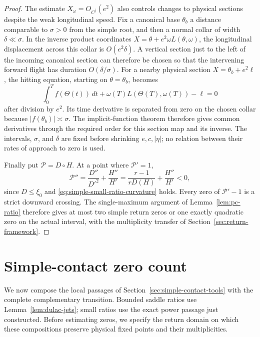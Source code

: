 \begin{proof}
The estimate $X_\omega=O_{C^j}(e^2)$ also controls changes to physical
sections despite the weak longitudinal speed. Fix a
canonical base $\theta_b$ a distance comparable to $\sigma>0$ from
the simple root, and then a normal collar of width $\delta\ll\sigma$.
In the inverse product coordinates
$X=\theta+e^2\omega L(\theta,\omega)$, the longitudinal displacement
across this collar is $O(e^2\delta)$. A vertical section just to the
left of the incoming canonical section can therefore be chosen so that
the intervening forward flight has duration $O(\delta/\sigma)$.
For a nearby physical section $X=\theta_b+e^2\ell$, the hitting
equation, starting on $\theta=\theta_b$, becomes
\[
 \int_0^T f(\Theta(t))\,dt
       +\omega(T)L(\Theta(T),\omega(T))-\ell=0
\]
after division by $e^2$. Its time derivative is separated from zero
on the chosen collar because $|f(\theta_b)|\asymp\sigma$.
The implicit-function theorem therefore gives common derivatives
through the required order for this section map and its inverse.
The intervals, $\sigma$, and $\delta$ are fixed before shrinking
$e,c,|\eta|$; no relation between their rates of approach to zero is
used.

Finally put $\mathcal P=D\circ H$.  At a point where $\mathcal P'=1$,
\[
 \mathcal P''=\frac{D''}{D'^2}+\frac{H''}{H'}
              =\frac{r-1}{rD(H)}+\frac{H''}{H'}<0,
\]
since $D\le\xi_0$ and \eqref{eq:simple-small-ratio-curvature} holds.
Every zero of $\mathcal P'-1$ is a strict downward crossing.
The single-maximum argument of Lemma~\ref{lem:pc-ratio} therefore gives
at most two simple return zeros or one exactly quadratic zero on the
actual interval, with the multiplicity transfer of
Section~\ref{sec:return-framework}.
\end{proof}



\section{Simple-contact zero count}\label{sec:simple-contact}

We now compose the local passages of
Section~\ref{sec:simple-contact-tools} with the complete complementary
transition. Bounded saddle ratios use Lemma~\ref{lem:dulac-jets}; small
ratios use the exact power passage just constructed. Before estimating
zeros, we specify the return domain on which these compositions preserve
physical fixed points and their multiplicities.

